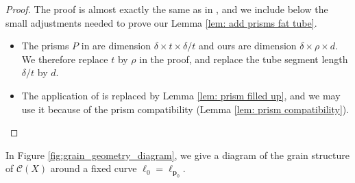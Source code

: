 \documentclass[12pt]{amsart}
\numberwithin{equation}{section}
\newcommand{\1}{\mathbbm{1}}
\newcommand{\p}{\mathbf p}
\begin{document}
\begin{proof}
    The proof is almost exactly the same as in \cite[Lemma 2.12]{KWZ}, and we include below the small adjustments needed to prove our Lemma \ref{lem: add prisms fat tube}.
    \begin{itemize}
        \item The prisms $P$ in \cite{KWZ} are dimension $\delta \times t \times \delta/t$ and ours are dimension $\delta \times \rho \times d$. We therefore replace $t$ by $\rho$ in the proof, and replace the tube segment length $\delta / t$ by $d$.
        \item The application of \cite[Lemma 2.2]{KWZ} is replaced by Lemma \ref{lem: prism filled up}, and we may use it because of the prism compatibility (Lemma \ref{lem: prism compatibility}). 
    \end{itemize}
\end{proof}
In Figure \ref{fig:grain_geometry_diagram}, we give a diagram of the grain structure of $\mathcal C(X)$ around a fixed curve $\ell_0 = \ell_{\p_0}$.
\end{document}
